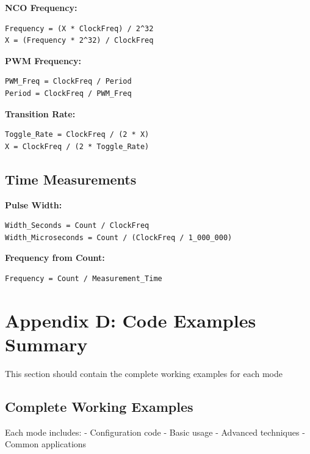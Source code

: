 \documentclass[11pt,a4paper,oneside,english]{book}
\begin{document}
\textbf{NCO Frequency:}

\begin{lstlisting}
Frequency = (X * ClockFreq) / 2^32
X = (Frequency * 2^32) / ClockFreq
\end{lstlisting}

\textbf{PWM Frequency:}

\begin{lstlisting}
PWM_Freq = ClockFreq / Period
Period = ClockFreq / PWM_Freq
\end{lstlisting}

\textbf{Transition Rate:}

\begin{lstlisting}
Toggle_Rate = ClockFreq / (2 * X)
X = ClockFreq / (2 * Toggle_Rate)
\end{lstlisting}

\hypertarget{time-measurements}{%
\section{Time Measurements}\label{time-measurements}}

\textbf{Pulse Width:}

\begin{lstlisting}
Width_Seconds = Count / ClockFreq
Width_Microseconds = Count / (ClockFreq / 1_000_000)
\end{lstlisting}

\textbf{Frequency from Count:}

\begin{lstlisting}
Frequency = Count / Measurement_Time
\end{lstlisting}

\clearpage

\clearpage

\hypertarget{appendix-d-code-examples-summary}{%
\chapter{Appendix D: Code Examples
Summary}\label{appendix-d-code-examples-summary}}

This section should contain the complete working examples for each mode

\hypertarget{complete-working-examples}{%
\section{Complete Working Examples}\label{complete-working-examples}}

Each mode includes: - Configuration code - Basic usage - Advanced
techniques - Common applications
\end{document}
